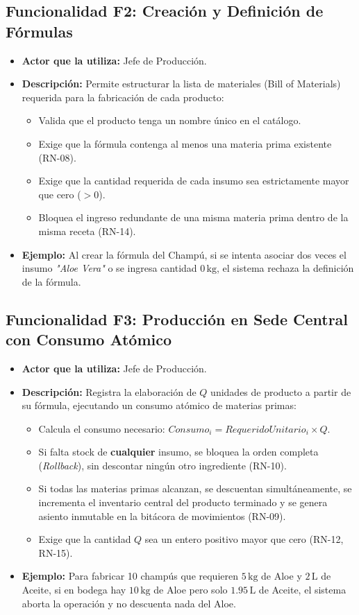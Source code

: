 \documentclass[11pt,a4paper]{article}
\begin{document}
\subsection{Funcionalidad F2: Creación y Definición de Fórmulas}
\begin{itemize}
    \item \textbf{Actor que la utiliza:} Jefe de Producción.
    \item \textbf{Descripción:} Permite estructurar la lista de materiales (Bill of Materials) requerida para la fabricación de cada producto:
    \begin{itemize}
        \item Valida que el producto tenga un nombre único en el catálogo.
        \item Exige que la fórmula contenga al menos una materia prima existente (RN-08).
        \item Exige que la cantidad requerida de cada insumo sea estrictamente mayor que cero ($>0$).
        \item Bloquea el ingreso redundante de una misma materia prima dentro de la misma receta (RN-14).
    \end{itemize}
    \item \textbf{Ejemplo:} Al crear la fórmula del Champú, si se intenta asociar dos veces el insumo \textit{"Aloe Vera"} o se ingresa cantidad $0\,\text{kg}$, el sistema rechaza la definición de la fórmula.
\end{itemize}

\subsection{Funcionalidad F3: Producción en Sede Central con Consumo Atómico}
\begin{itemize}
    \item \textbf{Actor que la utiliza:} Jefe de Producción.
    \item \textbf{Descripción:} Registra la elaboración de $Q$ unidades de producto a partir de su fórmula, ejecutando un consumo atómico de materias primas:
    \begin{itemize}
        \item Calcula el consumo necesario: $Consumo_i = RequeridoUnitario_i \times Q$.
        \item Si falta stock de \textbf{cualquier} insumo, se bloquea la orden completa (\textit{Rollback}), sin descontar ningún otro ingrediente (RN-10).
        \item Si todas las materias primas alcanzan, se descuentan simultáneamente, se incrementa el inventario central del producto terminado y se genera asiento inmutable en la bitácora de movimientos (RN-09).
        \item Exige que la cantidad $Q$ sea un entero positivo mayor que cero (RN-12, RN-15).
    \end{itemize}
    \item \textbf{Ejemplo:} Para fabricar 10 champús que requieren $5\,\text{kg}$ de Aloe y $2\,\text{L}$ de Aceite, si en bodega hay $10\,\text{kg}$ de Aloe pero solo $1.95\,\text{L}$ de Aceite, el sistema aborta la operación y no descuenta nada del Aloe.
\end{itemize}
\end{document}

